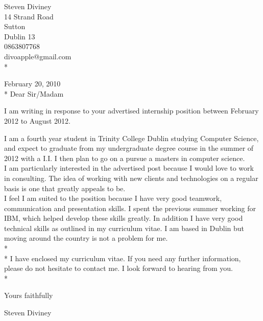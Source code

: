 \documentclass{res}
\begin{document}
 

\begin{flushright}
   Steven Diviney \\
   14 Strand Road \\
   Sutton \\
   Dublin 13 \\
   0863807768 \\
   divoapple@gmail.com \\* \vspace{10 mm}
\end{flushright}
\begin{flushleft}
 
February 20, 2010\\*\vspace{10 mm}
Dear Sir/Madam
\end{flushleft}
I am writing in response to your advertised internship position between February 2012 to August 2012.

I am a fourth year student in Trinity College Dublin studying Computer Science, and expect to graduate from my undergraduate degree course in the summer of 2012 with a I.I. I then plan to go on a pursue a masters in computer science.\\
I am particularly interested in the advertised post because I would love to work in consulting. The idea of working with new clients and technologies on a regular basis is one that greatly appeals to be.\\
I feel I am suited to the position because I have very good teamwork, communication and presentation skills. I spent the previous summer working for IBM, which helped develop these skills greatly. In addition I have very good technical skills as outlined in my curriculum vitae. I am based in Dublin but moving around the country is not a problem for me.
\\*
\\*
I have enclosed my curriculum vitae. If you need any further information, please do not hesitate to contact me. I look forward to hearing from you.\\*

\begin{flushleft}
Yours faithfully\\\vspace{10mm}

Steven Diviney\\
\end{flushleft}


\newpage
\end{document}
